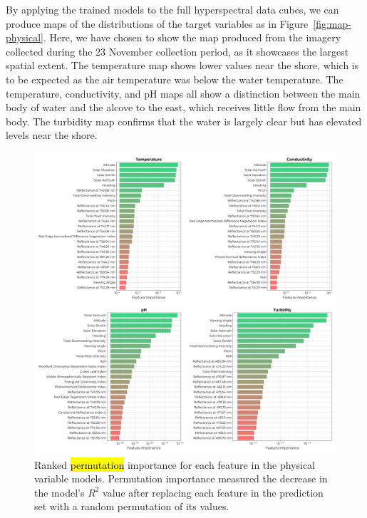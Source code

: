 \documentclass[remotesensing,article,accept,pdftex,moreauthors]{Definitions/mdpi}
\begin{document}
By applying the trained models to the full hyperspectral data cubes, we can produce maps of the distributions of the target variables as in Figure~\ref{fig:map-physical}. Here, we have chosen to show the map produced from the imagery collected during the 23 November collection period, as it showcases the largest spatial extent. The temperature map shows lower values near the shore, which is to be expected as the air temperature was below the water temperature. The temperature, conductivity, and pH maps all show a distinction between the main body of water and the alcove to the east, which receives little flow from the main body. The turbidity map confirms that the water is largely clear but has elevated levels near the shore.


\begin{figure}[H]

\vspace{-0.15in}
\hspace{-6pt}\includegraphics[width=\columnwidth]{figures/results/fits/physical-ranking.pdf}
\vspace{-0.1in}
\caption{Ranked
 \hl{permutation} %
 importance for each feature in the physical variable models. Permutation importance measured the decrease in the model's $R^2$ value after replacing each feature in the prediction set with a random permutation of its values.\label{fig:physical-fi}}
\end{figure}  
\end{document}

